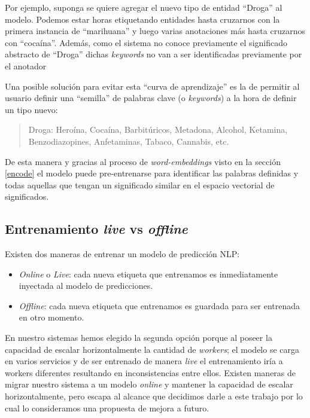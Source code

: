 \documentclass[12pt,a4paper,]{scrartcl}
\providecommand{\tightlist}{%
  \setlength{\itemsep}{0pt}\setlength{\parskip}{0pt}}
\begin{document}
Por ejemplo, suponga se quiere agregar el nuevo tipo de entidad \enquote{Droga} al modelo. Podemos estar horas etiquetando entidades hasta cruzarnos con la primera instancia de \enquote{marihuana} y luego varias anotaciones más hasta cruzarnos con \enquote{cocaína}. Además, como el sistema no conoce previamente el significado abstracto de \enquote{Droga} dichas \emph{keywords} no van a ser identificadas previamente por el anotador

Una posible solución para evitar esta \enquote{curva de aprendizaje} es la de permitir al usuario definir una \enquote{semilla} de palabras clave (o \emph{keywords}) a la hora de definir un tipo nuevo:

\begin{quote}
Droga: Heroína, Cocaína, Barbitúricos, Metadona, Alcohol, Ketamina, Benzodiazopines, Anfetaminas, Tabaco, Cannabis, etc.
\end{quote}

De esta manera y gracias al proceso de \emph{word-embeddings} visto en la sección \ref{encode} el modelo puede pre-entrenarse para identificar las palabras definidas y todas aquellas que tengan un significado similar en el espacio vectorial de significados.

\hypertarget{entrenamiento-live-vs-offline}{%
\subsection{\texorpdfstring{Entrenamiento \emph{live} vs \emph{offline}}{Entrenamiento live vs offline}}\label{entrenamiento-live-vs-offline}}

Existen dos maneras de entrenar un modelo de predicción NLP:

\begin{itemize}
\tightlist
\item
  \emph{Online} o \emph{Live}: cada nueva etiqueta que entrenamos es inmediatamente inyectada al modelo de predicciones.
\item
  \emph{Offline}: cada nueva etiqueta que entrenamos es guardada para ser entrenada en otro momento.
\end{itemize}

En nuestro sistemas hemos elegido la segunda opción porque al poseer la capacidad de escalar horizontalmente la cantidad de \emph{workers}; el modelo se carga en varios servicios y de ser entrenado de manera \emph{live} el entrenamiento iría a workers diferentes resultando en inconsistencias entre ellos. Existen maneras de migrar nuestro sistema a un modelo \emph{online} y mantener la capacidad de escalar horizontalmente, pero escapa al alcance que decidimos darle a este trabajo por lo cual lo consideramos una propuesta de mejora a futuro.
\end{document}
